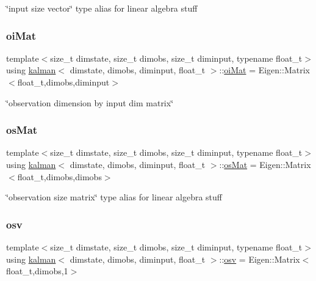 \char`\"{}input size vector\char`\"{} type alias for linear algebra stuff \mbox{\label{classkalman_a35298f18f0b699f700e2d55d94bf54fc}} 
\subsubsection{\texorpdfstring{oi\+Mat}{oiMat}}
{\footnotesize\ttfamily template$<$size\+\_\+t dimstate, size\+\_\+t dimobs, size\+\_\+t diminput, typename float\+\_\+t$>$ \\
using \hyperlink{classkalman}{kalman}$<$ dimstate, dimobs, diminput, float\+\_\+t $>$\+::\hyperlink{classkalman_a35298f18f0b699f700e2d55d94bf54fc}{oi\+Mat} =  Eigen\+::\+Matrix$<$float\+\_\+t,dimobs,diminput$>$}

\char`\"{}observation dimension by input dim matrix\char`\"{} \mbox{\label{classkalman_a28ffd71604fac7b25492b1b43379e046}} 
\subsubsection{\texorpdfstring{os\+Mat}{osMat}}
{\footnotesize\ttfamily template$<$size\+\_\+t dimstate, size\+\_\+t dimobs, size\+\_\+t diminput, typename float\+\_\+t$>$ \\
using \hyperlink{classkalman}{kalman}$<$ dimstate, dimobs, diminput, float\+\_\+t $>$\+::\hyperlink{classkalman_a28ffd71604fac7b25492b1b43379e046}{os\+Mat} =  Eigen\+::\+Matrix$<$float\+\_\+t,dimobs,dimobs$>$}

\char`\"{}observation size matrix\char`\"{} type alias for linear algebra stuff \mbox{\label{classkalman_a0172e54797a5d5b0acc4168894adc6d5}} 
\subsubsection{\texorpdfstring{osv}{osv}}
{\footnotesize\ttfamily template$<$size\+\_\+t dimstate, size\+\_\+t dimobs, size\+\_\+t diminput, typename float\+\_\+t$>$ \\
using \hyperlink{classkalman}{kalman}$<$ dimstate, dimobs, diminput, float\+\_\+t $>$\+::\hyperlink{classkalman_a0172e54797a5d5b0acc4168894adc6d5}{osv} =  Eigen\+::\+Matrix$<$float\+\_\+t,dimobs,1$>$}

